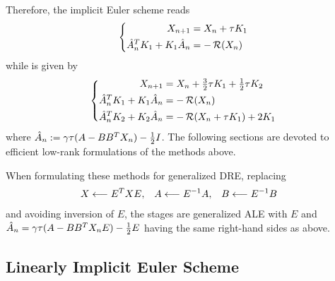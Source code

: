 Therefore, the implicit Euler scheme  reads
\begin{equation}
\label{eq:ros:DRE:ros1}
\left\{
\begin{aligned}
  X_{n+1} &= X_n + \tau K_1 \\
  \hat A_n^T K_1 + K_1 \hat A_n &= -\operatorname{\mathcal R}(X_n)
\end{aligned}
\right.
\end{equation}
while  is given by
\begin{equation}
\label{eq:ros:DRE:ros2}
\left\{
\begin{aligned}
  X_{n+1} &= X_n + \tfrac{3}{2} \tau K_1 + \tfrac{1}{2} \tau K_2 \\
  \hat A_n^T K_1 + K_1 \hat A_n &= -\operatorname{\mathcal R}(X_n) \\
  \hat A_n^T K_2 + K_2 \hat A_n &= -\operatorname{\mathcal R}(X_n + \tau K_1) + 2K_1
\end{aligned}
\right.
\end{equation}
where $\hat A_n := \gamma\tau(A - BB^T X_n) - \frac{1}{2} I$.
The following sections are devoted to efficient low-rank formulations of the methods above.

\begin{remark}
  When formulating these methods for generalized \ac{DRE},
  \ie replacing
  \begin{align*}
    X &\longleftarrow E^T X E, &
    A &\longleftarrow E^{-1} A, &
    B &\longleftarrow E^{-1} B
  \end{align*}
  and avoiding inversion of $E$,
  the stages are generalized \ac{ALE}
  with $E$ and $\hat A_n = \gamma\tau(A - BB^T X_n E) - \frac{1}{2} E$
  having the same right-hand sides as above.
\end{remark}

\subsection{Linearly Implicit Euler Scheme}


